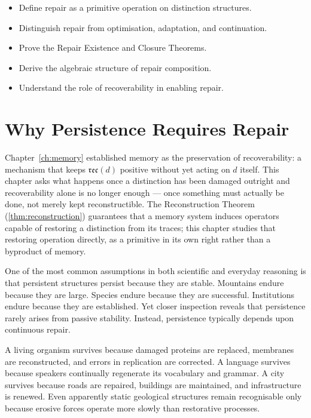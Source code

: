 \documentclass[12pt,twoside,openright]{book}
\newcommand{\reco}{\mathfrak{rec}}
\newenvironment{objectives}{%
  \begin{tcolorbox}[colback=DistBlue!5,colframe=DistBlue,
    title={\faCheckCircle\enspace Learning Objectives},
    fonttitle=\sffamily\bfseries\color{white},
    attach boxed title to top left={yshift=-2mm,xshift=4mm},
    boxed title style={colback=DistBlue},breakable]
  \begin{itemize}[leftmargin=*,nosep]}{%
  \end{itemize}\end{tcolorbox}\vspace{1em}}
\begin{document}
\begin{objectives}
  \item Define repair as a primitive operation on
        distinction structures.
  \item Distinguish repair from optimisation, adaptation,
        and continuation.
  \item Prove the Repair Existence and Closure Theorems.
  \item Derive the algebraic structure of repair
        composition.
  \item Understand the role of recoverability in enabling
        repair.
\end{objectives}

\section{Why Persistence Requires Repair}
\label{sec:ch7-why-persistence}

Chapter~\ref{ch:memory} established memory as the
preservation of recoverability: a mechanism that keeps
$\reco(d)$ positive without yet acting on $d$ itself. This
chapter asks what happens once a distinction has been
damaged outright and recoverability alone is no longer
enough --- once something must actually be done, not merely
kept reconstructible. The Reconstruction Theorem
(\cref{thm:reconstruction}) guarantees that a memory system
induces operators capable of restoring a distinction from
its traces; this chapter studies that restoring operation
directly, as a primitive in its own right rather than a
byproduct of memory.

One of the most common assumptions in both scientific and
everyday reasoning is that persistent structures persist
because they are stable. Mountains endure because they are
large. Species endure because they are successful.
Institutions endure because they are established. Yet
closer inspection reveals that persistence rarely arises
from passive stability. Instead, persistence typically
depends upon continuous repair.

A living organism survives because damaged proteins are
replaced, membranes are reconstructed, and errors in
replication are corrected. A language survives because
speakers continually regenerate its vocabulary and grammar.
A city survives because roads are repaired, buildings are
maintained, and infrastructure is renewed. Even apparently
static geological structures remain recognisable only
because erosive forces operate more slowly than restorative
processes.
\end{document}
